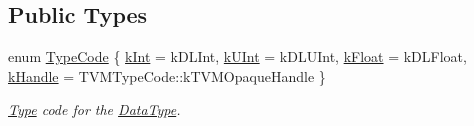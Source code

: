 \subsection*{Public Types}
\begin{DoxyCompactItemize}
\item 
enum \hyperlink{classtvm_1_1runtime_1_1DataType_a3c9ce1627be2550f656cd37b6c698c7d}{Type\+Code} \{ \hyperlink{classtvm_1_1runtime_1_1DataType_a3c9ce1627be2550f656cd37b6c698c7daba80c33310f753ce7578ba71f8b19450}{k\+Int} = k\+D\+L\+Int, 
\hyperlink{classtvm_1_1runtime_1_1DataType_a3c9ce1627be2550f656cd37b6c698c7da2c35d4ea9e95ede0b5a1909a87cbc9f2}{k\+U\+Int} = k\+D\+L\+U\+Int, 
\hyperlink{classtvm_1_1runtime_1_1DataType_a3c9ce1627be2550f656cd37b6c698c7da6622631a910a54272097f7f4b6373e9d}{k\+Float} = k\+D\+L\+Float, 
\hyperlink{classtvm_1_1runtime_1_1DataType_a3c9ce1627be2550f656cd37b6c698c7da2a59b355bef5ebc40bd78833666197cb}{k\+Handle} = T\+V\+M\+Type\+Code\+:\+:k\+T\+V\+M\+Opaque\+Handle
 \}\begin{DoxyCompactList}\small\item\em \hyperlink{classtvm_1_1Type}{Type} code for the \hyperlink{classtvm_1_1runtime_1_1DataType}{Data\+Type}. \end{DoxyCompactList}
\end{DoxyCompactItemize}
